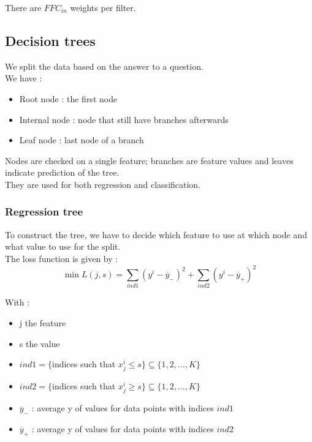\documentclass[../main.tex]{subfiles}
\begin{document}
There are $FFC_{in}$ weights per filter.\\

\subsection{Decision trees}
We split the data based on the answer to a question.\\
We have : \begin{itemize}
    \item Root node : the first node\\
    \item Internal node : node that still have branches afterwards\\
    \item Leaf node : last node of a branch\\
\end{itemize}

Nodes are checked on a single feature; branches are feature values and leaves indicate prediction of the tree.\\
They are used for both regression and classification.\\

\subsubsection{Regression tree}
To construct the tree, we have to decide which feature to use at which node and what value to use for the split. \\
The loss function is given by : \begin{equation}
    \min L(j,s) = \sum_{ind1} (y^i- \overline{y}_-)^2 + \sum_{ind2} (y^i- \overline{y}_+)^2
\end{equation}

With : \begin{itemize}
    \item j the feature\\
    \item s the value\\
    \item $ind1 = \{$indices such that $x_j^i\leq s \} \subseteq \{1,2,\dots, K\}$\\
    \item $ind2 = \{$indices such that $x_j^i\geq s \} \subseteq \{1,2,\dots, K\}$\\
    \item $\overline{y}_-$ : average y of values for data points with indices $ind1$\\
    \item $\overline{y}_+$ : average y of values for data points with indices $ind2$\\
\end{itemize}
\end{document}
